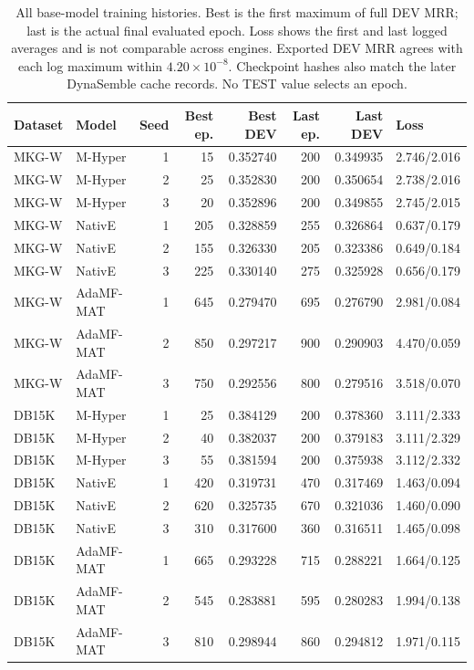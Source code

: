 \begin{table}[tbp]
\centering\footnotesize
\caption{All base-model training histories. Best is the first maximum of full DEV MRR; last is the actual final evaluated epoch. Loss shows the first and last logged averages and is not comparable across engines. Exported DEV MRR agrees with each log maximum within $4.20\times10^{-8}$. Checkpoint hashes also match the later DynaSemble cache records. No TEST value selects an epoch.}
\label{tab:data-checkpoints}
\begin{tabular}{llrrrrrl}
\toprule
Dataset & Model & Seed & Best ep. & Best DEV & Last ep. & Last DEV & Loss\\
\midrule
MKG-W & M-Hyper & 1 & 15 & 0.352740 & 200 & 0.349935 & 2.746/2.016\\
MKG-W & M-Hyper & 2 & 25 & 0.352830 & 200 & 0.350654 & 2.738/2.016\\
MKG-W & M-Hyper & 3 & 20 & 0.352896 & 200 & 0.349855 & 2.745/2.015\\
MKG-W & NativE & 1 & 205 & 0.328859 & 255 & 0.326864 & 0.637/0.179\\
MKG-W & NativE & 2 & 155 & 0.326330 & 205 & 0.323386 & 0.649/0.184\\
MKG-W & NativE & 3 & 225 & 0.330140 & 275 & 0.325928 & 0.656/0.179\\
MKG-W & AdaMF-MAT & 1 & 645 & 0.279470 & 695 & 0.276790 & 2.981/0.084\\
MKG-W & AdaMF-MAT & 2 & 850 & 0.297217 & 900 & 0.290903 & 4.470/0.059\\
MKG-W & AdaMF-MAT & 3 & 750 & 0.292556 & 800 & 0.279516 & 3.518/0.070\\
DB15K & M-Hyper & 1 & 25 & 0.384129 & 200 & 0.378360 & 3.111/2.333\\
DB15K & M-Hyper & 2 & 40 & 0.382037 & 200 & 0.379183 & 3.111/2.329\\
DB15K & M-Hyper & 3 & 55 & 0.381594 & 200 & 0.375938 & 3.112/2.332\\
DB15K & NativE & 1 & 420 & 0.319731 & 470 & 0.317469 & 1.463/0.094\\
DB15K & NativE & 2 & 620 & 0.325735 & 670 & 0.321036 & 1.460/0.090\\
DB15K & NativE & 3 & 310 & 0.317600 & 360 & 0.316511 & 1.465/0.098\\
DB15K & AdaMF-MAT & 1 & 665 & 0.293228 & 715 & 0.288221 & 1.664/0.125\\
DB15K & AdaMF-MAT & 2 & 545 & 0.283881 & 595 & 0.280283 & 1.994/0.138\\
DB15K & AdaMF-MAT & 3 & 810 & 0.298944 & 860 & 0.294812 & 1.971/0.115\\
\bottomrule
\end{tabular}
\end{table}
